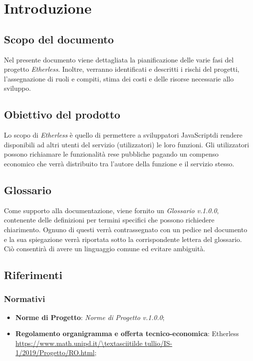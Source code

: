 \section{Introduzione}

\subsection{Scopo del documento}
Nel presente documento viene dettagliata la pianificazione delle varie fasi del progetto \textit{Etherless}. Inoltre, verranno identificati e descritti i rischi del progetti, l'assegnazione di ruoli e compiti, stima dei costi e delle risorse necessarie allo sviluppo.

\subsection{Obiettivo del prodotto}
Lo scopo di \textit{Etherless} è quello di permettere a sviluppatori JavaScript\glo di rendere disponibili ad altri utenti del servizio (utilizzatori) le loro funzioni. Gli utilizzatori possono richiamare le funzionalità rese pubbliche pagando un compenso economico che verrà distribuito tra l'autore della funzione e il servizio stesso.
	
\subsection{Glossario}
Come supporto alla documentazione, viene fornito un \textit{Glossario v.1.0.0}\docs, contenente delle definizioni per termini specifici che possono richiedere chiarimento. Ognuno di questi verrà contrassegnato con un pedice \glo nel documento e la sua spiegazione verrà riportata sotto la corrispondente lettera del glossario. Ciò consentirà di avere un linguaggio comune ed evitare ambiguità. 
	
\subsection{Riferimenti}
\subsubsection{Normativi}
	\begin{itemize}
		\item \textbf{Norme di Progetto}: \textit{Norme di Progetto v.1.0.0}\docs;
		\item \textbf{Regolamento organigramma e offerta tecnico-economica}: Etherless\\ 
			\url{https://www.math.unipd.it/\textasciitilde tullio/IS-1/2019/Progetto/RO.html};
	\end{itemize}
